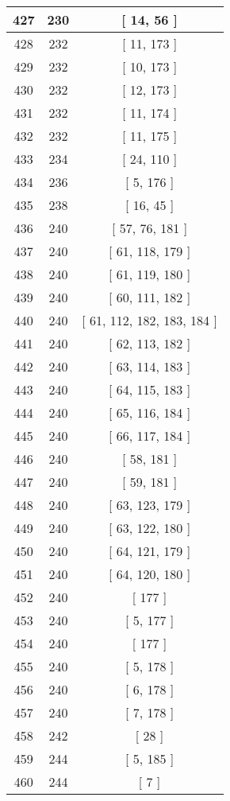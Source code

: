 \begin{center}
\begin{longtable}[H]{|| c c c ||}
\hline
427 & 230 & [ 14, 56 ] \\ 
\hline
428 & 232 & [ 11, 173 ] \\ 
\hline
429 & 232 & [ 10, 173 ] \\ 
\hline
430 & 232 & [ 12, 173 ] \\ 
\hline
431 & 232 & [ 11, 174 ] \\ 
\hline
432 & 232 & [ 11, 175 ] \\ 
\hline
433 & 234 & [ 24, 110 ] \\ 
\hline
434 & 236 & [ 5, 176 ] \\ 
\hline
435 & 238 & [ 16, 45 ] \\ 
\hline
436 & 240 & [ 57, 76, 181 ] \\ 
\hline
437 & 240 & [ 61, 118, 179 ] \\ 
\hline
438 & 240 & [ 61, 119, 180 ] \\ 
\hline
439 & 240 & [ 60, 111, 182 ] \\ 
\hline
440 & 240 & [ 61, 112, 182, 183, 184 ] \\ 
\hline
441 & 240 & [ 62, 113, 182 ] \\ 
\hline
442 & 240 & [ 63, 114, 183 ] \\ 
\hline
443 & 240 & [ 64, 115, 183 ] \\ 
\hline
444 & 240 & [ 65, 116, 184 ] \\ 
\hline
445 & 240 & [ 66, 117, 184 ] \\ 
\hline
446 & 240 & [ 58, 181 ] \\ 
\hline
447 & 240 & [ 59, 181 ] \\ 
\hline
448 & 240 & [ 63, 123, 179 ] \\ 
\hline
449 & 240 & [ 63, 122, 180 ] \\ 
\hline
450 & 240 & [ 64, 121, 179 ] \\ 
\hline
451 & 240 & [ 64, 120, 180 ] \\ 
\hline
452 & 240 & [ 177 ] \\ 
\hline
453 & 240 & [ 5, 177 ] \\ 
\hline
454 & 240 & [ 177 ] \\ 
\hline
455 & 240 & [ 5, 178 ] \\ 
\hline
456 & 240 & [ 6, 178 ] \\ 
\hline
457 & 240 & [ 7, 178 ] \\ 
\hline
458 & 242 & [ 28 ] \\ 
\hline
459 & 244 & [ 5, 185 ] \\ 
\hline
460 & 244 & [ 7 ] \\ 

\end{longtable}
\end{center}
